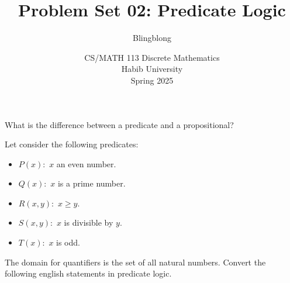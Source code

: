 \documentclass[a4paper]{exam}
\title{Problem Set 02: Predicate Logic}
\author{Blingblong} %
\date{CS/MATH 113 Discrete Mathematics\\Habib University\\Spring 2025}
\begin{document}
\maketitle

\begin{questions}
    \question What is the difference between a predicate and a propositional?
    \begin{solution}
    \end{solution}

    \question Let consider the following predicates:
    \begin{itemize}
        \item $P(x):$ $x$ an even number.
        \item $Q(x):$ $x$ is a prime number.
        \item $R(x,y):$ $x \geq y$.
        \item $S(x,y):$ $x$ is divisible by $y$.
        \item $T(x):$ $x$ is odd. 
    \end{itemize}
    The domain for quantifiers is the set of all natural numbers.
    Convert the following english statements in predicate logic.
\end{questions}
\end{document}
